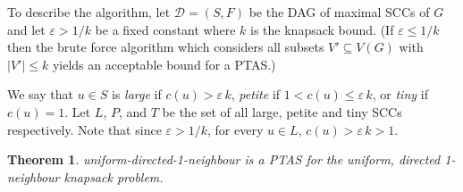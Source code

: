 \documentclass[12pt]{article}
\newtheorem{theorem}{Theorem}
\begin{document}
To describe the algorithm, let $\mathcal{D} = (S,F)$ be the DAG of maximal
SCCs of $G$ and let $\varepsilon > 1/k$ be a fixed constant where $k$ is
the knapsack bound. (If $\varepsilon \leq 1/k$
then the brute force algorithm which considers all subsets $V' \subseteq V(G)$
with $|V'| \leq k$ yields an acceptable bound for a PTAS.)

We say that $u\in S$ is {\em large} if $c(u) > \varepsilon\, k$,
{\em petite} if $1 < c(u) \leq \varepsilon\, k$, or {\em tiny} if $c(u)=1$.
Let $L$, $P$, and $T$ be the set of all large, petite and tiny SCCs
respectively.
Note that since $\varepsilon > 1/k$, for every $u \in L$, $c(u)> \varepsilon\, k >1$.



\begin{center}
\end{center}



\begin{theorem} \label{thm:1-neighbour-ptas} {\sc
uniform-directed-1-neighbour} is a PTAS for the uniform, directed
1-neighbour knapsack problem.
\end{theorem}
\end{document}
